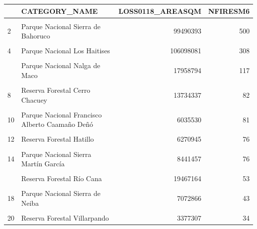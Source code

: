 \documentclass[10pt,landscape,a3paper]{article}
\begin{document}
\begin{table}[H]
\centering
\begin{tabular}[t]{llrr}
\toprule
  & CATEGORY\_NAME & LOSS0118\_AREASQM & NFIRESM6\\
\midrule
\cellcolor{lightgray}{1} & \cellcolor{lightgray}{Parque Nacional José del Carmen Ramírez} & \cellcolor{lightgray}{90356487} & \cellcolor{lightgray}{727}\\
2 & Parque Nacional Sierra de Bahoruco & 99490393 & 500\\
\cellcolor{lightgray}{3} & \cellcolor{lightgray}{Parque Nacional Valle Nuevo} & \cellcolor{lightgray}{48606234} & \cellcolor{lightgray}{392}\\
4 & Parque Nacional Los Haitises & 106098081 & 308\\
\cellcolor{lightgray}{5} & \cellcolor{lightgray}{Parque Nacional Manolo Tavarez Justo} & \cellcolor{lightgray}{34746840} & \cellcolor{lightgray}{128}\\
\addlinespace
6 & Parque Nacional Nalga de Maco & 17958794 & 117\\
\cellcolor{lightgray}{7} & \cellcolor{lightgray}{Reserva Forestal Alto Mao} & \cellcolor{lightgray}{30640838} & \cellcolor{lightgray}{104}\\
8 & Reserva Forestal Cerro Chacuey & 13734337 & 82\\
\cellcolor{lightgray}{9} & \cellcolor{lightgray}{Parque Nacional Montaña La Humeadora} & \cellcolor{lightgray}{18277567} & \cellcolor{lightgray}{82}\\
10 & Parque Nacional Francisco Alberto Caamaño Deñó & 6035530 & 81\\
\addlinespace
\cellcolor{lightgray}{11} & \cellcolor{lightgray}{Parque Nacional Armando Bermúdez} & \cellcolor{lightgray}{17271703} & \cellcolor{lightgray}{79}\\
12 & Reserva Forestal Hatillo & 6270945 & 76\\
\cellcolor{lightgray}{13} & \cellcolor{lightgray}{Monumento Natural Las Caobas} & \cellcolor{lightgray}{18868449} & \cellcolor{lightgray}{76}\\
14 & Parque Nacional Sierra Martín García & 8441457 & 76\\
\cellcolor{lightgray}{15} & \cellcolor{lightgray}{Via Panoramica Entrada de Mao} & \cellcolor{lightgray}{12301958} & \cellcolor{lightgray}{69}\\
\addlinespace
16 & Reserva Forestal Río Cana & 19467164 & 53\\
\cellcolor{lightgray}{17} & \cellcolor{lightgray}{Monumento Natural Salto de Socoa} & \cellcolor{lightgray}{13282788} & \cellcolor{lightgray}{53}\\
18 & Parque Nacional Sierra de Neiba & 7072866 & 43\\
\cellcolor{lightgray}{19} & \cellcolor{lightgray}{Refugio de Vida Silvestre Río Chacuey} & \cellcolor{lightgray}{5762642} & \cellcolor{lightgray}{38}\\
20 & Reserva Forestal Villarpando & 3377307 & 34\\
\bottomrule
\end{tabular}
\end{table}
\end{document}
